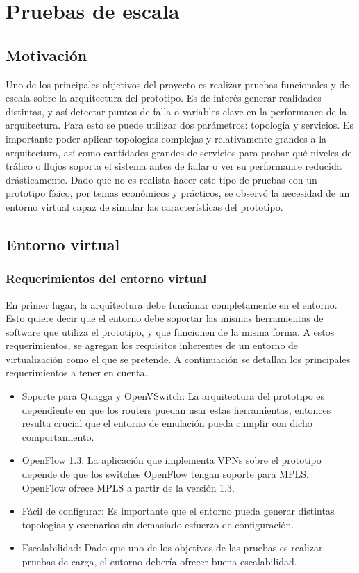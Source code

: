 \documentclass[a4paper,12pt]{report}
\begin{document}
\tableofcontents
\chapter{Pruebas de escala}
\section{Motivación}
Uno de los principales objetivos del proyecto es realizar pruebas funcionales y de escala sobre la arquitectura del prototipo. Es de interés generar realidades distintas, y así detectar puntos de falla o variables clave en la performance de la arquitectura. Para esto se puede utilizar dos parámetros: topología y servicios. Es importante poder aplicar topologías complejas y relativamente grandes a la arquitectura, así como cantidades grandes de servicios para probar qué niveles de tráfico o flujos soporta el sistema antes de fallar o ver su performance reducida drásticamente. Dado que no es realista hacer este tipo de pruebas con un prototipo físico, por temas económicos y prácticos, se observó la necesidad de un entorno virtual capaz de simular las características del prototipo.

\section{Entorno virtual}
\subsection{Requerimientos del entorno virtual}
En primer lugar, la arquitectura debe funcionar completamente en el entorno. Esto quiere decir que el entorno debe soportar las mismas herramientas de software que utiliza el prototipo, y que funcionen de la misma forma. A estos requerimientos, se agregan los requisitos inherentes de un entorno de virtualización como el que se pretende. A continuación se detallan los principales requerimientos a tener en cuenta.
\begin{itemize} 
	\item Soporte para Quagga y OpenVSwitch: La arquitectura del prototipo es dependiente en que los routers puedan usar estas herramientas, entonces resulta crucial que el entorno de emulación pueda cumplir con dicho comportamiento.
	\item OpenFlow 1.3: La aplicación que implementa VPNs sobre el prototipo depende de que los switches OpenFlow tengan soporte para MPLS. OpenFlow ofrece MPLS a partir de la versión 1.3.
	\item Fácil de configurar: Es importante que el entorno pueda generar distintas topologias y escenarios sin demasiado esfuerzo de configuración.
	\item Escalabilidad: Dado que uno de los objetivos de las pruebas es realizar pruebas de carga, el entorno debería ofrecer buena escalabilidad.
\end{itemize}
\end{document}
